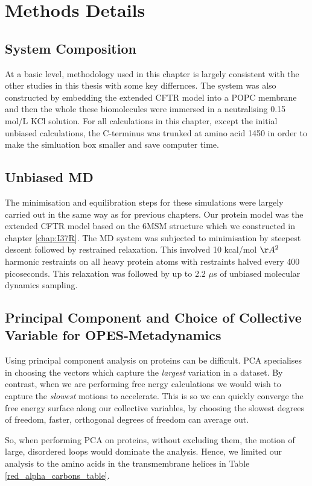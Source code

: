 \section{Methods Details}
\subsection{System Composition}
At a basic level, methodology used in this chapter is largely consistent with the other studies in this thesis with some key differnces. The system was also constructed by embedding the extended CFTR model into a POPC membrane and then the whole these biomolecules were immersed in a neutralising 0.15 mol/L KCl solution. For all calculations in this chapter, except the initial unbiased calculations, the C-terminus was trunked at amino acid 1450 in order to make the simluation box smaller and save computer time.

\subsection{Unbiased MD }
The minimisation and equilibration steps for these simulations were largely carried out in the same way as for previous chapters. Our protein model was the extended CFTR model based on the 6MSM structure \cite{zhang2018} which we constructed in chapter \ref{chap:I37R}. The MD system was subjected to minimisation by steepest descent followed by restrained relaxation. This involved 10 kcal/mol $\AA^2$ harmonic restraints on all heavy protein atoms with restraints halved every 400 picoseconds. This relaxation was followed by up to 2.2 $\mu$s of unbiased molecular dynamics sampling.

\subsection {Principal Component and Choice of Collective Variable for OPES-Metadynamics}
Using principal component analysis on proteins can be difficult. PCA specialises in choosing the vectors which capture the \textit{largest} variation in a dataset. By contrast, when we are performing free nergy calculations we would wish to capture the \textit{slowest} motions to accelerate. This is so we can quickly converge the free energy surface along our collective variables, by choosing the slowest degrees of freedom, faster, orthogonal degrees of freedom can average out. 

So, when performing PCA on proteins, without excluding them, the motion of large, disordered loops would dominate the analysis. Hence, we limited our analysis to the amino acids in the transmembrane helices in Table \ref{red_alpha_carbons_table}. 

